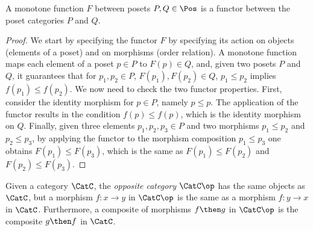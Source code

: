 \begin{lemma}
\label{lemma:posetfunctor}
A monotone function $F$ between posets $P,Q \in \Pos$ is a functor between the poset categories $P$ and $Q$.
\end{lemma}
\begin{proof}
We start by specifying the functor $F$ by specifying its action on objects (elements of a poset) and on morphisms (order relation). A monotone function maps each element of a poset $p\in P$ to $F(p) \in Q$, and, given two posets $P$ and $Q$, it guarantees that for $p_1,p_2\in P$, $F(p_1),F(p_2)\in Q$,  $p_1\leq p_2$ implies $f(p_1)\leq f(p_2)$. We now need to check the two functor properties. First, consider the identity morphism for $p\in P$, namely $p\leq p$. The application of the functor results in the condition $f(p)\leq f(p)$, which is the identity morphism on $Q$. Finally, given three elements $p_1,p_2,p_3\in P$ and two morphisms $p_1\leq p_2$ and $p_2\leq p_3$, by applying the functor to the morphism composition $p_1\leq p_3$ one obtains $F(p_1)\leq F(p_3)$, which is the same as $F(p_1)\leq F(p_2)$ and $F(p_2)\leq F(p_3)$.
\end{proof}

\begin{shaded}
\begin{definition}
\label{def:oppositecat}
Given a category $\CatC$, the \emph{opposite category} $\CatC\op$ has the same objects as $\CatC$, but a morphism $f\colon x\to y$ in $\CatC\op$ is the same as a morphism $f\colon y\to x$ in $\CatC$. Furthermore, a composite of morphisms $f\then g$ in $\CatC\op$ is the composite $g\then f$ in $\CatC$.
\end{definition}
\end{shaded}

